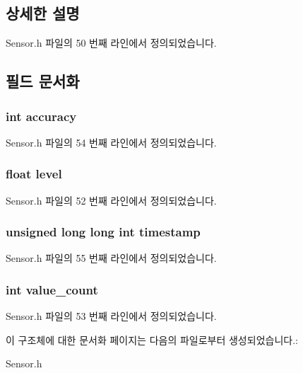 \subsection{상세한 설명}


Sensor.\-h 파일의 50 번째 라인에서 정의되었습니다.



\subsection{필드 문서화}
\hypertarget{struct___light__data_a5565cf9073275f9713f9016e7c10d25f}{
\subsubsection[{accuracy}]{\setlength{\rightskip}{0pt plus 5cm}int accuracy}}\label{struct___light__data_a5565cf9073275f9713f9016e7c10d25f}


Sensor.\-h 파일의 54 번째 라인에서 정의되었습니다.

\hypertarget{struct___light__data_a450c3ab9b94a4663caad892b7193b547}{
\subsubsection[{level}]{\setlength{\rightskip}{0pt plus 5cm}float level}}\label{struct___light__data_a450c3ab9b94a4663caad892b7193b547}


Sensor.\-h 파일의 52 번째 라인에서 정의되었습니다.

\hypertarget{struct___light__data_a8de02c4128636a7bf630ff5428f60c8d}{
\subsubsection[{timestamp}]{\setlength{\rightskip}{0pt plus 5cm}unsigned long long int timestamp}}\label{struct___light__data_a8de02c4128636a7bf630ff5428f60c8d}


Sensor.\-h 파일의 55 번째 라인에서 정의되었습니다.

\hypertarget{struct___light__data_a40a079bfc72408819dc78da308203a74}{
\subsubsection[{value\-\_\-count}]{\setlength{\rightskip}{0pt plus 5cm}int value\-\_\-count}}\label{struct___light__data_a40a079bfc72408819dc78da308203a74}


Sensor.\-h 파일의 53 번째 라인에서 정의되었습니다.



이 구조체에 대한 문서화 페이지는 다음의 파일로부터 생성되었습니다.\-:\begin{DoxyCompactItemize}
\item 
Sensor.\-h\end{DoxyCompactItemize}
